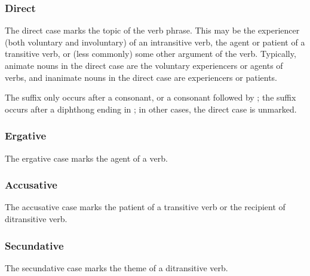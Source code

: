 \documentclass[grammar]{subfiles}
\begin{document}
%

\subsubsection{Direct}
\label{nm_direct_case}

The direct case marks the topic of the verb phrase.  This may be the
experiencer (both voluntary and involuntary) of an intransitive verb, the
agent or patient of a transitive verb, or (less commonly) some other argument
of the verb.  Typically, animate nouns in the direct case are the voluntary
experiencers or agents of verbs, and inanimate nouns in the direct case are
experiencers or patients.

The suffix  only occurs after a consonant, or a consonant followed
by ; the suffix  occurs after a diphthong ending in
; in other cases, the direct case is unmarked.

\subsubsection{Ergative}
\label{nm_ergative_case}

The ergative case marks the agent of a verb.

\subsubsection{Accusative}
\label{nm_accusative_case}

The accusative case marks the patient of a transitive verb or the recipient of ditransitive verb.

\subsubsection{Secundative}
\label{nm_secundative_case}

The secundative case marks the theme of a ditransitive verb.

%
\end{document}
